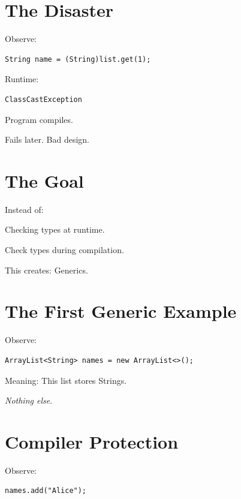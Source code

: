 \documentclass[11pt,a4paper]{book}
\begin{document}
\section{The Disaster}

Observe:

\begin{verbatim} 
String name = (String)list.get(1);
\end{verbatim}

Runtime:

\begin{verbatim}
ClassCastException
\end{verbatim}

Program compiles.

Fails later.
\textcolor{RosettaRed}{Bad design}.

\section{The Goal}

Instead of:

Checking types at runtime.

Check types during compilation.

This creates:
\textcolor{RosettaJade}{Generics}.

\section{The First Generic Example}

Observe:

\begin{verbatim} 
ArrayList<String> names = new ArrayList<>();
\end{verbatim}

Meaning:
This list stores Strings.

\emph{Nothing else}.

\section{Compiler Protection}

Observe:

\begin{verbatim} 
names.add("Alice");
\end{verbatim}
\end{document}
